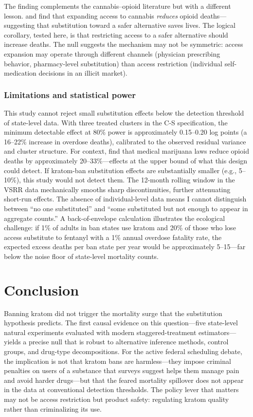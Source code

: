 \documentclass[12pt]{article}
\begin{document}
The finding complements the cannabis--opioid literature but with a different lesson. \citet{bradford2016medical} and \citet{powell2018recreational} find that expanding access to cannabis \emph{reduces} opioid deaths---suggesting that substitution toward a safer alternative saves lives. The logical corollary, tested here, is that restricting access to a safer alternative should increase deaths. The null suggests the mechanism may not be symmetric: access expansion may operate through different channels (physician prescribing behavior, pharmacy-level substitution) than access restriction (individual self-medication decisions in an illicit market).

\subsubsection*{Limitations and statistical power} This study cannot reject small substitution effects below the detection threshold of state-level data. With three treated clusters in the C-S specification, the minimum detectable effect at 80\% power is approximately 0.15--0.20 log points (a 16--22\% increase in overdose deaths), calibrated to the observed residual variance and cluster structure. For context, \citet{powell2018recreational} find that medical marijuana laws reduce opioid deaths by approximately 20--33\%---effects at the upper bound of what this design could detect. If kratom-ban substitution effects are substantially smaller (e.g., 5--10\%), this study would not detect them. The 12-month rolling window in the VSRR data mechanically smooths sharp discontinuities, further attenuating short-run effects. The absence of individual-level data means I cannot distinguish between ``no one substituted'' and ``some substituted but not enough to appear in aggregate counts.'' A back-of-envelope calculation illustrates the ecological challenge: if 1\% of adults in ban states use kratom and 20\% of those who lose access substitute to fentanyl with a 1\% annual overdose fatality rate, the expected excess deaths per ban state per year would be approximately 5--15---far below the noise floor of state-level mortality counts.


\section{Conclusion}

Banning kratom did not trigger the mortality surge that the substitution hypothesis predicts. The first causal evidence on this question---five state-level natural experiments evaluated with modern staggered-treatment estimators---yields a precise null that is robust to alternative inference methods, control groups, and drug-type decompositions. For the active federal scheduling debate, the implication is not that kratom bans are harmless---they impose criminal penalties on users of a substance that surveys suggest helps them manage pain and avoid harder drugs---but that the feared mortality spillover does not appear in the data at conventional detection thresholds. The policy lever that matters may not be access restriction but product safety: regulating kratom quality rather than criminalizing its use.
\end{document}

